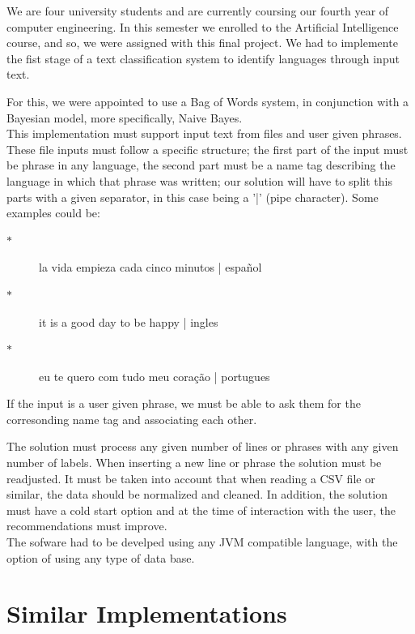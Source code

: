 \documentclass[sigconf,12pt,review=false,natbib=false]{acmart}
\begin{document}
We are four university students and are currently coursing our fourth year of computer engineering. In this semester
we enrolled to the Artificial Intelligence course, and so, we were assigned with this final project. We had to 
implemente the fist stage of a text classification system to identify languages through input text.

For this, we were appointed to use a Bag of Words system, in conjunction with a Bayesian model, more specifically,
Naive Bayes. \\

This implementation must support input text from files and user given phrases. These file inputs must follow a specific
structure; the first part of the input must be phrase in any language, the second part must be a name tag describing
the language in which that phrase was written; our solution will have to split this parts with a given separator,
in this case being a '|' (pipe character). Some examples could be: \\ 

\begin{description}
  \item[$\ast$] la vida empieza cada cinco minutos | español 
  \item[$\ast$] it is a good day to be happy | ingles
  \item[$\ast$] eu te quero com tudo meu coração | portugues \\ 
\end{description}

If the input is a user given phrase, we must be able to ask them for the corresonding name tag and associating each 
other.

The solution must process any given number of lines or phrases with any given number of labels. When inserting a new
line or phrase the solution must be readjusted. It must be taken into account that when reading a CSV file or similar,
the data should be normalized and cleaned. In addition, the solution must have a cold start option and at the time
of interaction with the user, the recommendations must improve. \\

The sofware had to be develped using any JVM compatible language, with the option of using any type of data base. \\

\section{Similar Implementations}
\end{document}
